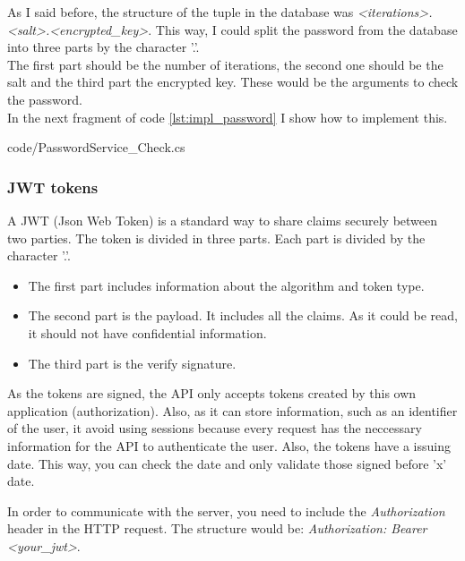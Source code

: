             As I said before, the structure of the tuple in the database was \textit{<iterations>.<salt>.<encrypted\_key>}. This way, I could split the password from the database into three parts by the character '.'. \\

            The first part should be the number of iterations, the second one should be the salt and the third part the encrypted key. These would be the arguments to check the password. \\

            In the next fragment of code \ref{lst:impl_password} I show how to implement this.

            
            {code/PasswordService_Check.cs}

        \subsubsection{JWT tokens}
            A JWT (Json Web Token) \cite{JWT.io} is a standard way to share claims securely between two parties. The token is divided in three parts. Each part is divided by the character '.'.
            \begin{itemize}[noitemsep]
                \item The first part includes information about the algorithm and token type.
                \item The second part is the payload. It includes all the claims. As it could be read, it should not have confidential information.
                \item The third part is the verify signature.
            \end{itemize}

            As the tokens are signed, the API only accepts tokens created by this own application (authorization). Also, as it can store information, such as 
            an identifier of the user, it avoid using sessions because every request has the neccessary information for the API to authenticate the user.
            Also, the tokens have a issuing date. This way, you can check the date and only validate those signed before 'x' date.

            In order to communicate with the server, you need to include the \textit{Authorization} header in the HTTP request. The structure would be: \textit{Authorization: Bearer <your\_jwt>}.

